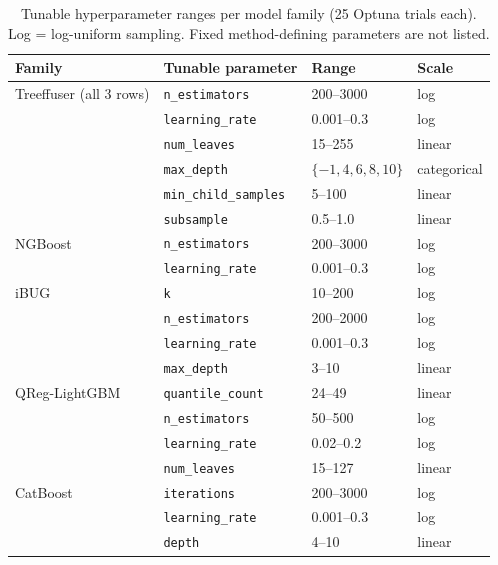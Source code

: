 \documentclass{tpm2026}
\begin{document}
\begin{table}[!h]
  \centering
  \caption{Tunable hyperparameter ranges per model family (25 Optuna trials each). Log = log-uniform sampling. Fixed method-defining parameters are not listed.}\label{tab:tuning-spaces}
  \scriptsize
  \begin{tabular}{llll}
    \toprule
    Family & Tunable parameter & Range & Scale \\
    \midrule
    Treeffuser (all 3 rows) & \texttt{n\_estimators}     & 200--3000 & log \\
                            & \texttt{learning\_rate}    & 0.001--0.3 & log \\
                            & \texttt{num\_leaves}       & 15--255 & linear \\
                            & \texttt{max\_depth}        & $\{-1, 4, 6, 8, 10\}$ & categorical \\
                            & \texttt{min\_child\_samples} & 5--100 & linear \\
                            & \texttt{subsample}         & 0.5--1.0 & linear \\
    \midrule
    NGBoost     & \texttt{n\_estimators}     & 200--3000 & log \\
                & \texttt{learning\_rate}    & 0.001--0.3 & log \\
    \midrule
    iBUG        & \texttt{k}                 & 10--200 & log \\
                & \texttt{n\_estimators}     & 200--2000 & log \\
                & \texttt{learning\_rate}    & 0.001--0.3 & log \\
                & \texttt{max\_depth}        & 3--10 & linear \\
    \midrule
    QReg-LightGBM & \texttt{quantile\_count} & 24--49 & linear \\
                   & \texttt{n\_estimators}   & 50--500 & log \\
                   & \texttt{learning\_rate}  & 0.02--0.2 & log \\
                   & \texttt{num\_leaves}     & 15--127 & linear \\
    \midrule
    CatBoost    & \texttt{iterations}        & 200--3000 & log \\
                & \texttt{learning\_rate}    & 0.001--0.3 & log \\
                & \texttt{depth}             & 4--10 & linear \\

\end{tabular}
\end{table}
\end{document}
